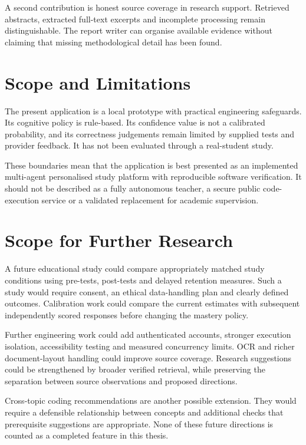 A second contribution is honest source coverage in research support. Retrieved abstracts, extracted full-text excerpts and incomplete processing remain distinguishable. The report writer can organise available evidence without claiming that missing methodological detail has been found.

\section{Scope and Limitations}
The present application is a local prototype with practical engineering safeguards. Its cognitive policy is rule-based. Its confidence value is not a calibrated probability, and its correctness judgements remain limited by supplied tests and provider feedback. It has not been evaluated through a real-student study.

These boundaries mean that the application is best presented as an implemented multi-agent personalised study platform with reproducible software verification. It should not be described as a fully autonomous teacher, a secure public code-execution service or a validated replacement for academic supervision.

\section{Scope for Further Research}
A future educational study could compare appropriately matched study conditions using pre-tests, post-tests and delayed retention measures. Such a study would require consent, an ethical data-handling plan and clearly defined outcomes. Calibration work could compare the current estimates with subsequent independently scored responses before changing the mastery policy.

Further engineering work could add authenticated accounts, stronger execution isolation, accessibility testing and measured concurrency limits. OCR and richer document-layout handling could improve source coverage. Research suggestions could be strengthened by broader verified retrieval, while preserving the separation between source observations and proposed directions.

Cross-topic coding recommendations are another possible extension. They would require a defensible relationship between concepts and additional checks that prerequisite suggestions are appropriate. None of these future directions is counted as a completed feature in this thesis.
